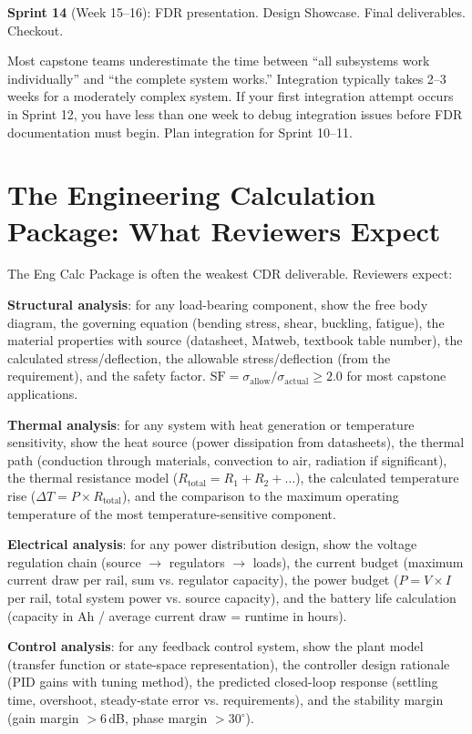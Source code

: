 \textbf{Sprint 14} (Week 15--16): FDR presentation. Design Showcase. Final deliverables. Checkout.

\begin{warningbox}
Most capstone teams underestimate the time between ``all subsystems work individually'' and ``the complete system works.'' Integration typically takes 2--3 weeks for a moderately complex system. If your first integration attempt occurs in Sprint 12, you have less than one week to debug integration issues before FDR documentation must begin. Plan integration for Sprint 10--11.
\end{warningbox}



\section{The Engineering Calculation Package: What Reviewers Expect}
The Eng Calc Package is often the weakest CDR deliverable. Reviewers expect:

\textbf{Structural analysis}: for any load-bearing component, show the free body diagram, the governing equation (bending stress, shear, buckling, fatigue), the material properties with source (datasheet, Matweb, textbook table number), the calculated stress/deflection, the allowable stress/deflection (from the requirement), and the safety factor. $\text{SF} = \sigma_{\text{allow}} / \sigma_{\text{actual}} \geq 2.0$ for most capstone applications.

\textbf{Thermal analysis}: for any system with heat generation or temperature sensitivity, show the heat source (power dissipation from datasheets), the thermal path (conduction through materials, convection to air, radiation if significant), the thermal resistance model ($R_{\text{total}} = R_1 + R_2 + \ldots$), the calculated temperature rise ($\Delta T = P \times R_{\text{total}}$), and the comparison to the maximum operating temperature of the most temperature-sensitive component.

\textbf{Electrical analysis}: for any power distribution design, show the voltage regulation chain (source $\to$ regulators $\to$ loads), the current budget (maximum current draw per rail, sum vs. regulator capacity), the power budget ($P = V \times I$ per rail, total system power vs. source capacity), and the battery life calculation (capacity in Ah / average current draw = runtime in hours).

\textbf{Control analysis}: for any feedback control system, show the plant model (transfer function or state-space representation), the controller design rationale (PID gains with tuning method), the predicted closed-loop response (settling time, overshoot, steady-state error vs. requirements), and the stability margin (gain margin $>$6\,dB, phase margin $>$30$^\circ$).

